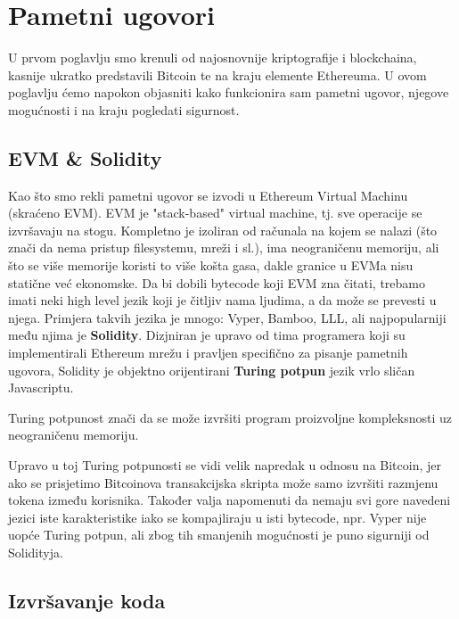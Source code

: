\documentclass[a4paper,oneside,12pt]{memoir} %
\begin{document}
\chapter{Pametni ugovori}

U prvom poglavlju smo krenuli od najosnovnije kriptografije i blockchaina, kasnije ukratko predstavili Bitcoin te na kraju elemente Ethereuma. U ovom poglavlju ćemo napokon objasniti kako funkcionira sam pametni ugovor, njegove mogućnosti i na kraju pogledati sigurnost.

\section{EVM \& Solidity}

Kao što smo rekli pametni ugovor se izvodi u Ethereum Virtual Machinu (skraćeno EVM). EVM je "stack-based" virtual machine, tj. sve operacije se izvršavaju na stogu. Kompletno je izoliran od računala na kojem se nalazi (što znači da nema pristup filesystemu, mreži i sl.), ima neograničenu memoriju, ali što se više memorije koristi to više košta gasa, dakle granice u EVMa nisu statične već ekonomske. Da bi dobili bytecode koji EVM zna čitati, trebamo imati neki high level jezik koji je čitljiv nama ljudima, a da može se prevesti u njega. Primjera takvih jezika je mnogo: Vyper, Bamboo, LLL, ali najpopularniji među njima je \textbf{Solidity}. Dizjniran je upravo od tima programera koji su implementirali Ethereum mrežu i pravljen specifično za pisanje pametnih ugovora, Solidity je objektno orijentirani \textbf{Turing potpun} jezik vrlo sličan Javascriptu.

\begin{napomena}
Turing potpunost znači da se može izvršiti program proizvoljne kompleksnosti uz neograničenu memoriju.
\end{napomena}

Upravo u toj Turing potpunosti se vidi velik napredak u odnosu na Bitcoin, jer ako se prisjetimo Bitcoinova transakcijska skripta može samo izvršiti razmjenu tokena između korisnika. Također valja napomenuti da nemaju svi gore navedeni jezici iste karakteristike iako se kompajliraju u isti bytecode, npr. Vyper nije uopće Turing potpun, ali zbog tih smanjenih mogućnosti je puno sigurniji od Solidityja.

\section{Izvršavanje koda}
\end{document}

